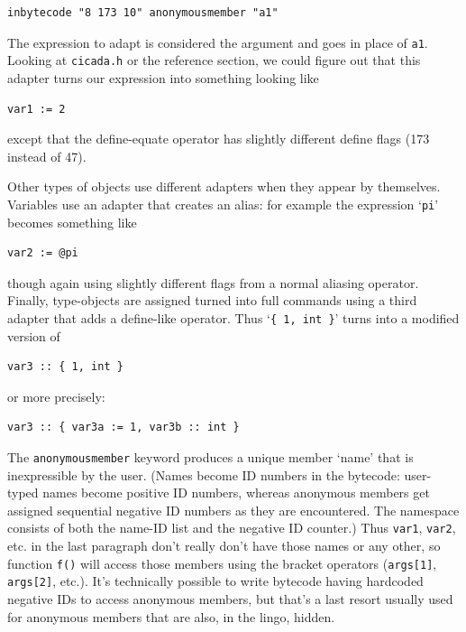 \documentclass{article}
\newenvironment{code}{
       \begin{list}{}{
               \setlength{\leftmargin}{.4in}
               \setlength{\rightmargin}{0in}
               \setlength{\topsep}{.2in}
       }
       \small
       \item[] }
       { \end{list}   }
\begin{document}
\begin{code} \begin{verbatim}
inbytecode "8 173 10" anonymousmember "a1"
\end{verbatim} \end{code}

\noindent The expression to adapt is considered the argument and goes in place of \verb#a1#.  Looking at \verb#cicada.h# or the reference section, we could figure out that this adapter turns our expression into something looking like

\begin{code} \begin{verbatim}
var1 := 2
\end{verbatim} \end{code}

\noindent except that the define-equate operator has slightly different define flags (173 instead of 47).

Other types of objects use different adapters when they appear by themselves.  Variables use an adapter that creates an alias:  for example the expression `\verb#pi#' becomes something like

\begin{code} \begin{verbatim}
var2 := @pi
\end{verbatim} \end{code}

\noindent though again using slightly different flags from a normal aliasing operator.  Finally, type-objects are assigned turned into full commands using a third adapter that adds a define-like operator.  Thus `\verb#{ 1, int }#' turns into a modified version of

\begin{code} \begin{verbatim}
var3 :: { 1, int }
\end{verbatim} \end{code}

\noindent or more precisely:

\begin{code} \begin{verbatim}
var3 :: { var3a := 1, var3b :: int }
\end{verbatim} \end{code}

The \verb#anonymousmember# keyword produces a unique member `name' that is inexpressible by the user.  (Names become ID numbers in the bytecode:  user-typed names become positive ID numbers, whereas anonymous members get assigned sequential negative ID numbers as they are encountered.  The namespace consists of both the name-ID list and the negative ID counter.)  Thus \verb#var1#, \verb#var2#, etc. in the last paragraph don't really don't have those names or any other, so function \verb#f()# will access those members using the bracket operators (\verb#args[1]#, \verb#args[2]#, etc.).  It's technically possible to write bytecode having hardcoded negative IDs to access anonymous members, but that's a last resort usually used for anonymous members that are also, in the lingo, hidden.
\end{document}
